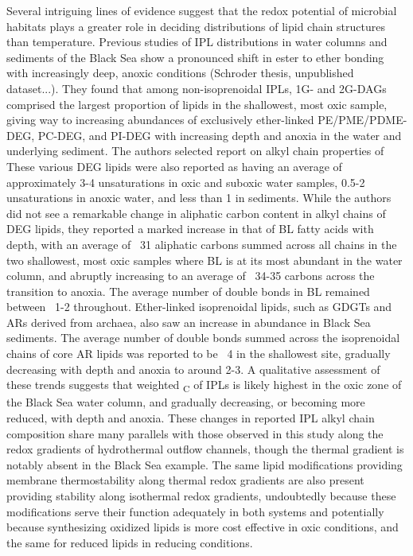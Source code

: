 Several intriguing lines of evidence suggest that the redox potential of microbial habitats plays a greater role in deciding distributions of lipid chain structures than temperature. Previous studies of IPL distributions in water columns and sediments of the Black Sea show a pronounced shift in ester to ether bonding with increasingly deep, anoxic conditions (Schroder thesis, unpublished dataset...). They found that among non-isoprenoidal IPLs, 1G- and 2G-DAGs comprised the largest proportion of lipids in the shallowest, most oxic sample, giving way to increasing abundances of exclusively ether-linked PE/PME/PDME-DEG, PC-DEG, and PI-DEG with increasing depth and anoxia in the water and underlying sediment. The authors selected report on alkyl chain properties of These various DEG lipids were also reported as having an average of approximately 3-4 unsaturations in oxic and suboxic water samples, 0.5-2 unsaturations in anoxic water, and less than 1 in sediments. While the authors did not see a remarkable change in aliphatic carbon content in alkyl chains of DEG lipids, they reported a marked increase in that of BL fatty acids with depth, with an average of ~31 aliphatic carbons summed across all chains in the two shallowest, most oxic samples where BL is at its most abundant in the water column, and abruptly increasing to an average of ~34-35 carbons across the transition to anoxia. The average number of double bonds in BL remained between ~1-2 throughout.  Ether-linked isoprenoidal lipids, such as GDGTs and ARs derived from archaea, also saw an increase in abundance in Black Sea sediments. The average number of double bonds summed across the isoprenoidal chains of core AR lipids was reported to be ~4 in the shallowest site, gradually decreasing with depth and anoxia to around 2-3. A qualitative assessment of these trends suggests that weighted \textsubscript{C} of IPLs is likely highest in the oxic zone of the Black Sea water column, and gradually decreasing, or becoming more reduced, with depth and anoxia. These changes in reported IPL alkyl chain composition share many parallels with those observed in this study along the redox gradients of hydrothermal outflow channels, though the thermal gradient is notably absent in the Black Sea example. The same lipid modifications providing membrane thermostability along thermal redox gradients are also present providing stability along isothermal redox gradients, undoubtedly because these modifications serve their function adequately in both systems and potentially because synthesizing oxidized lipids is more cost effective in oxic conditions, and the same for reduced lipids in reducing conditions.




